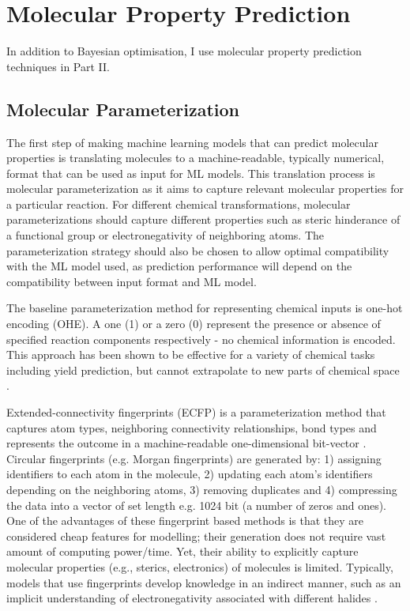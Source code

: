 \section{Molecular Property Prediction}

In addition to Bayesian optimisation, I use molecular property prediction techniques in Part II.

\subsection{Molecular Parameterization}

The first step of making machine learning models that can predict molecular properties is translating molecules to a machine-readable, typically numerical, format that can be used as input for ML models. This translation process is molecular parameterization as it aims to capture relevant molecular properties for a particular reaction. For different chemical transformations, molecular parameterizations should capture different properties such as steric hinderance of a functional group or electronegativity of neighboring atoms. The parameterization strategy should also be chosen to allow optimal compatibility with the ML model used, as prediction performance will depend on the compatibility between input format and ML model.

The baseline parameterization method for representing chemical inputs is one-hot encoding (OHE). A one (1) or a zero (0) represent the presence or absence of specified reaction components respectively - no chemical information is encoded. This approach has been shown to be effective for a variety of chemical tasks including yield prediction, but cannot extrapolate to new parts of chemical space \cite{Pomberger2023}. 

Extended-connectivity fingerprints (ECFP) is a parameterization method that captures atom types, neighboring connectivity relationships, bond types and represents the outcome in a machine-readable one-dimensional bit-vector \cite{Rogers2010}. Circular fingerprints (e.g. Morgan fingerprints) are generated by: 1) assigning identifiers to each atom in the molecule, 2) updating each atom’s identifiers depending on the neighboring atoms, 3) removing duplicates and 4) compressing the data into a vector of set length e.g. 1024 bit (a number of zeros and ones). One of the advantages of these fingerprint based methods is that they are considered cheap features for modelling; their generation does not require vast amount of computing power/time. Yet, their ability to explicitly capture molecular properties (e.g., sterics, electronics) of molecules is limited. Typically, models that use fingerprints develop knowledge in an indirect manner, such as an implicit understanding of electronegativity associated with different halides \cite{Eyke2020}.


